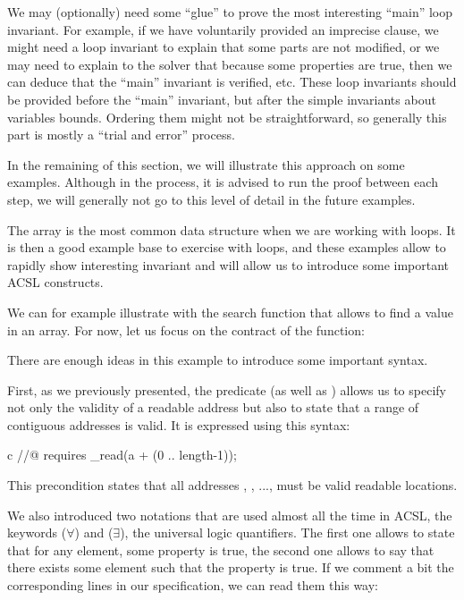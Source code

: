 We may (optionally) need some ``glue'' to prove the most interesting ``main''
loop invariant. For example, if we have voluntarily provided an imprecise
 clause, we might need a loop invariant to explain that
some parts are not modified, or we may need to explain to the solver that
because some properties are true, then we can deduce that the ``main'' invariant
is verified, etc. These loop invariants should be provided before the ``main''
invariant, but after the simple invariants about variables bounds. Ordering them
might not be straightforward, so generally this part is mostly a
``trial and error'' process.


In the remaining of this section, we will illustrate this approach on some
examples. Although in the process, it is advised to run the proof between each
step, we will generally not go to this level of detail in the future examples.


\label{l3:statements-loops-examples-ro}


The array is the most common data structure when we are working with loops.
It is then a good example base to exercise with loops, and these
examples allow to rapidly show interesting invariant and will allow us
to introduce some important ACSL constructs.


We can for example illustrate with the search function that allows to find a
value in an array. For now, let us focus on the contract of the function:




There are enough ideas in this example to introduce some important syntax.


First, as we previously presented, the
 predicate (as well as
) allows us to specify not only the
validity of a readable address but also to state that a range of
contiguous addresses is valid. It is expressed using this syntax:


\begin{CodeBlock}{c}
//@ requires \valid_read(a + (0 .. length-1));
\end{CodeBlock}


This precondition states that all addresses ,
, ...,  must be valid readable
locations.


We also introduced two notations that are used almost all the time in
ACSL, the keywords  ($\forall$) and
 ($\exists$), the universal logic
quantifiers. The first one allows to state that for any element, some
property is true, the second one allows to say that there exists some
element such that the property is true. If we comment a bit the
corresponding lines in our specification, we can read them this way:


